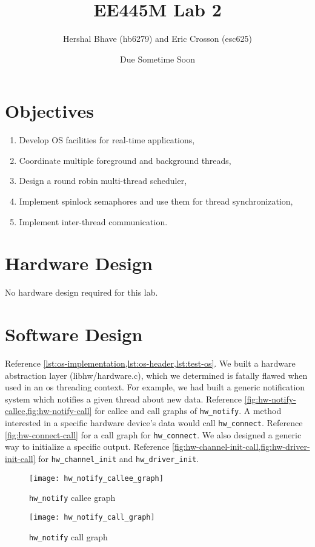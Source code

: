 \documentclass[12pt]{article}
\title{EE445M Lab 2}
\author{Hershal Bhave (hb6279) and Eric Crosson (esc625)}
\date{Due Sometime Soon}
\begin{document}
\maketitle

\section{Objectives}
\begin{enumerate}
\item Develop OS facilities for real-time applications,
\item Coordinate multiple foreground and background threads,
\item Design a round robin multi-thread scheduler,
\item Implement spinlock semaphores and use them for thread synchronization,
\item Implement inter-thread communication.
\end{enumerate}

\section{Hardware Design}
No hardware design required for this lab.

\section{Software Design}
Reference \cref{lst:os-implementation,lst:os-header,lst:test-os}. We
built a hardware abstraction layer (libhw/hardware.c), which we
determined is fatally flawed when used in an os threading context. For
example, we had built a generic notification system which notifies a
given thread about new data. Reference
\cref{fig:hw-notify-callee,fig:hw-notify-call} for callee and call
graphs of \verb|hw_notify|. A method interested in a specific hardware
device's data would call \verb|hw_connect|. Reference
\cref{fig:hw-connect-call} for a call graph for \verb|hw_connect|. We
also designed a generic way to initialize a specific output. Reference
\cref{fig:hw-channel-init-call,fig:hw-driver-init-call} for
\verb|hw_channel_init| and \verb|hw_driver_init|.

\begin{figure}
  \texttt{[image: hw\_notify\_callee\_graph]}
  \caption{\texttt{hw\_notify} callee graph}
  \label{fig:hw-notify-callee}
\end{figure}

\begin{figure}
  \texttt{[image: hw\_notify\_call\_graph]}
  \caption{\texttt{hw\_notify} call graph}
  \label{fig:hw-notify-call}
\end{figure}
\end{document}
